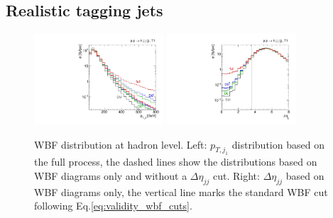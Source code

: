 \subsection{Realistic tagging jets}

\begin{figure}[t]
  \includegraphics[width=0.43\textwidth]{fig/validity/WBF_realistic_T1_j1pt.pdf}
  \hspace*{0.05\textwidth}
  \includegraphics[width=0.43\textwidth]{fig/validity/WBF_realistic_T1_deltaEtaJJ.pdf}
  \caption{WBF distribution at hadron level. Left: $p_{T,j_1}$
    distribution based on the full process, the dashed lines show the
    distributions based on WBF diagrams only and without a
    $\Delta \eta_{jj}$ cut. Right: $\Delta \eta_{jj}$ based on WBF
    diagrams only, the vertical line marks the standard WBF cut
    following Eq.\;\eqref{eq:validity_wbf_cuts}.}
  \label{fig:validity_realistic_jets}
\end{figure}

